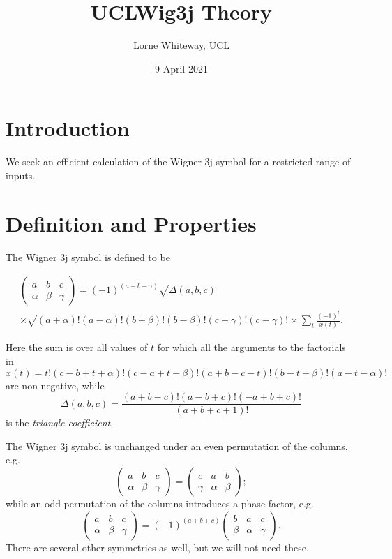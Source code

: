 \documentclass[11pt]{article}
\title{UCLWig3j Theory}
\author{Lorne Whiteway, UCL}
\date{9 April 2021}
\newcommand{\symthreejarray}[6]{{\left( \begin{array}{ccc} #1 & #2 & #3 \\ #4 & #5 & #6 \end{array} \right)} }
\begin{document}
\maketitle

\section{Introduction}

We seek an efficient calculation of the Wigner 3j symbol for a restricted range of inputs.

\section{Definition and Properties}

The Wigner 3j symbol is defined to be

\begin{multline}
\label{eq_symthreejarray_definition}
\symthreejarray{a}{b}{c}{\alpha}{\beta}{\gamma} = (-1)^{(a-b-\gamma)} \sqrt{\Delta(a,b,c)} \\
\times \sqrt{(a + \alpha)! (a - \alpha)! (b + \beta)! (b - \beta)! (c + \gamma)! (c - \gamma)!}  \times \sum_{t}{\frac{(-1)^t}{x(t)}}.
\end{multline}

\noindent Here the sum is over all values of $t$ for which all the arguments to the factorials in
\begin{equation}
x(t) = t! (c-b+t+\alpha)! (c-a+t-\beta)! (a+b-c-t)! (b-t+\beta)! (a-t-\alpha)!
\end{equation}
are non-negative, while
\begin{equation}
\Delta(a,b,c) = \frac{(a+b-c)! (a-b+c)! (-a+b+c)!}{(a+b+c+1)!}
\end{equation}
is the \textit{triangle coefficient}.

The Wigner 3j symbol is unchanged under an even permutation of the columns, e.g.
\begin{equation}
\label{eq_even_symmetry}
\symthreejarray{a}{b}{c}{\alpha}{\beta}{\gamma} = \symthreejarray{c}{a}{b}{\gamma}{\alpha}{\beta};
\end{equation}
while an odd permutation of the columns introduces a phase factor, e.g.
\begin{equation}
\label{eq_odd_symmetry}
\symthreejarray{a}{b}{c}{\alpha}{\beta}{\gamma} = (-1)^{(a+b+c)}\symthreejarray{b}{a}{c}{\beta}{\alpha}{\gamma}.
\end{equation}
There are several other symmetries as well, but we will not need these.
\end{document}
